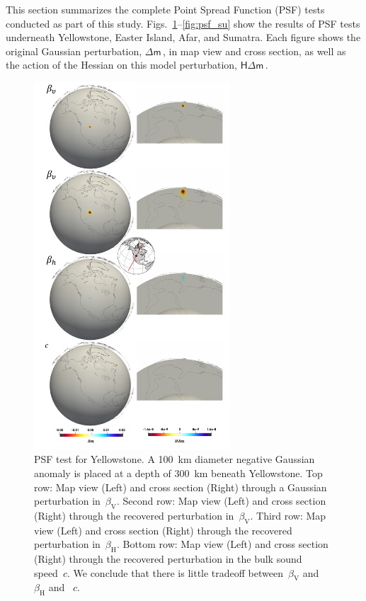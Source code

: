 \documentclass[extra,mreferee]{gji}
\begin{document}
This section summarizes the complete Point Spread Function (PSF) tests conducted as part of this study.
Figs.~\ref{fig:psf_yellowstone}--\ref{fig:psf_su} show the results of PSF tests underneath Yellowstone, Easter Island, Afar, and Sumatra.
Each figure shows the original Gaussian perturbation, $\mathsf{\Delta}\mathsf{m}$\,, in map view and cross section, as well as the action of the Hessian on this model perturbation, $\mathsf{H}\mathsf{\Delta}\mathsf{m}$\,.
\begin{figure}
  \centering
  \includegraphics[width=0.65\textwidth]{figures/psf/yellowstone.pdf}
  \caption{\small{PSF test for Yellowstone.
  A 100~km diameter negative Gaussian anomaly is placed at a depth of 300~km beneath Yellowstone.
  Top row: Map view (Left) and cross section (Right) through a Gaussian perturbation in~$\beta_\mathrm{V}$.
  Second row: Map view (Left) and cross section (Right) through the recovered perturbation in~$\beta_\mathrm{V}$.
  Third row: Map view (Left) and cross section (Right) through the recovered perturbation in~$\beta_\mathrm{H}$.
  Bottom row: Map view (Left) and cross section (Right) through the recovered perturbation in the bulk sound speed~$c$. We conclude that there is little tradeoff between~$\beta_\mathrm{V}$ and~$\beta_\mathrm{H}$ and ~$c$.
  }}
  \label{fig:psf_yellowstone}
\end{figure}
\end{document}
